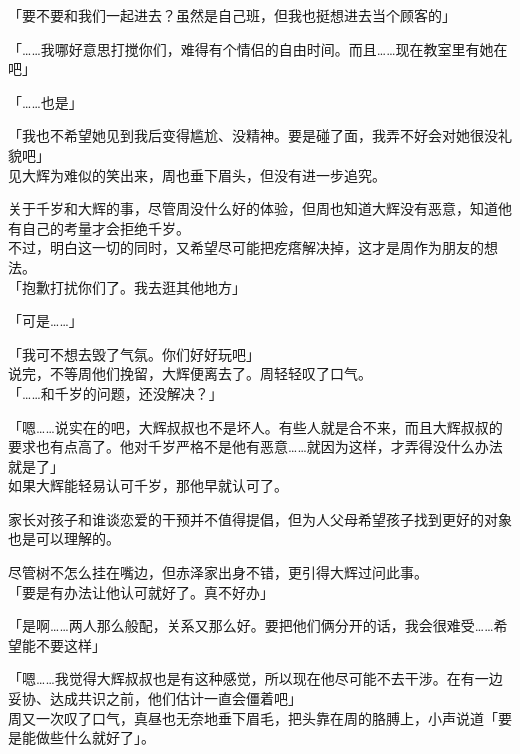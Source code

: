 「要不要和我们一起进去？虽然是自己班，但我也挺想进去当个顾客的」

「……我哪好意思打搅你们，难得有个情侣的自由时间。而且……现在教室里有她在吧」

「……也是」

「我也不希望她见到我后变得尴尬、没精神。要是碰了面，我弄不好会对她很没礼貌吧」\\

见大辉为难似的笑出来，周也垂下眉头，但没有进一步追究。

关于千岁和大辉的事，尽管周没什么好的体验，但周也知道大辉没有恶意，知道他有自己的考量才会拒绝千岁。\\

不过，明白这一切的同时，又希望尽可能把疙瘩解决掉，这才是周作为朋友的想法。\\

「抱歉打扰你们了。我去逛其他地方」

「可是……」

「我可不想去毁了气氛。你们好好玩吧」\\

说完，不等周他们挽留，大辉便离去了。周轻轻叹了口气。\\

「……和千岁的问题，还没解决？」

「嗯……说实在的吧，大辉叔叔也不是坏人。有些人就是合不来，而且大辉叔叔的要求也有点高了。他对千岁严格不是他有恶意……就因为这样，才弄得没什么办法就是了」\\

如果大辉能轻易认可千岁，那他早就认可了。

家长对孩子和谁谈恋爱的干预并不值得提倡，但为人父母希望孩子找到更好的对象也是可以理解的。

尽管树不怎么挂在嘴边，但赤泽家出身不错，更引得大辉过问此事。\\

「要是有办法让他认可就好了。真不好办」

「是啊……两人那么般配，关系又那么好。要把他们俩分开的话，我会很难受……希望能不要这样」

「嗯……我觉得大辉叔叔也是有这种感觉，所以现在他尽可能不去干涉。在有一边妥协、达成共识之前，他们估计一直会僵着吧」\\

周又一次叹了口气，真昼也无奈地垂下眉毛，把头靠在周的胳膊上，小声说道「要是能做些什么就好了」。
